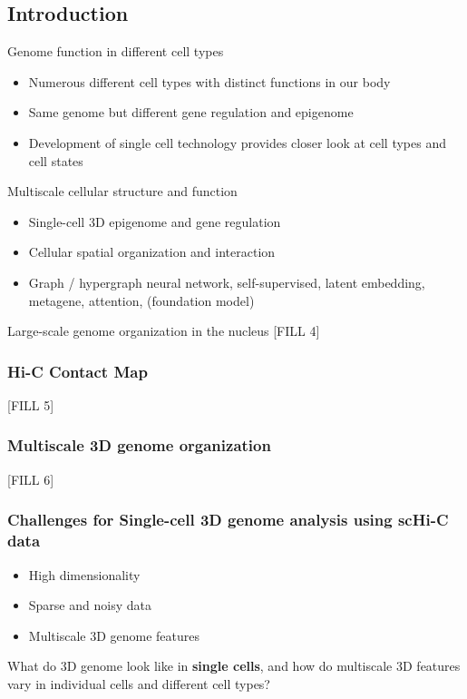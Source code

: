 \documentclass[10pt]{article}
\begin{document}
\subsection*{Introduction}
Genome function in different cell types
\begin{itemize}
	\item Numerous different cell types with distinct functions in our body
	\item Same genome but different gene regulation and epigenome
	\item Development of single cell technology provides closer look at cell types and cell states
\end{itemize}
Multiscale cellular structure and function
\begin{itemize}
	\item Single-cell 3D epigenome and gene regulation
	\item Cellular spatial organization and interaction
	\item Graph / hypergraph neural network, self-supervised, latent embedding, metagene, attention, (foundation model)
\end{itemize}
Large-scale genome organization in the nucleus
[FILL 4]

\subsubsection*{Hi-C Contact Map}
[FILL 5]

\subsubsection*{Multiscale 3D genome organization}
[FILL 6]

\subsubsection*{Challenges for Single-cell 3D genome analysis using scHi-C data}
\begin{itemize}
	\item High dimensionality
	\item Sparse and noisy data
	\item Multiscale 3D genome features
\end{itemize}
What do 3D genome look like in \textbf{single cells}, and how do multiscale 3D features vary in individual cells and different cell types?
\end{document}
